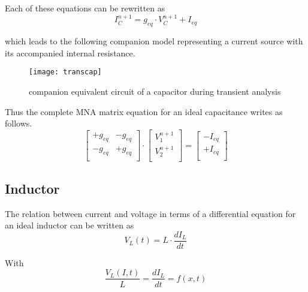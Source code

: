 Each of these equations can be rewritten as
\begin{equation}
I_C^{n+1} = g_{eq}\cdot V_C^{n+1} + I_{eq}
\end{equation}

which leads to the following companion model representing a current
source with its accompanied internal resistance.
\begin{figure}[ht]
\begin{center}
\texttt{[image: transcap]}
\end{center}
\caption{companion equivalent circuit of a capacitor during transient analysis}
\label{fig:TransCap}
\end{figure}
\FloatBarrier

Thus the complete MNA matrix equation for an ideal capacitance writes
as follows.
\begin{equation}
\begin{bmatrix}
+g_{eq} & -g_{eq}\\
-g_{eq} & +g_{eq}\\
\end{bmatrix}
\cdot
\begin{bmatrix}
V_1^{n+1}\\
V_2^{n+1}\\
\end{bmatrix}
=
\begin{bmatrix}
-I_{eq}\\
+I_{eq}\\
\end{bmatrix}
\end{equation}

\subsection{Inductor}

The relation between current and voltage in terms of a differential
equation for an ideal inductor can be written as
\begin{equation}
V_L(t) = L\cdot \dfrac{d I_L}{d t}
\end{equation}

With
\begin{equation}
\dfrac{V_L(I, t)}{L} = \dfrac{d I_L}{d t} = f(x,t)
\end{equation}


